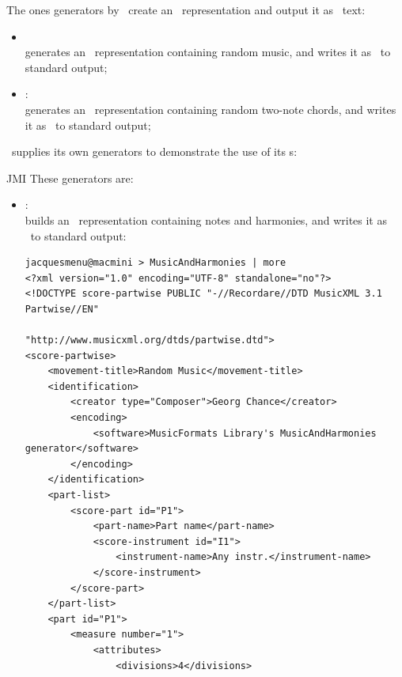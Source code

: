The ones generators by \libmusicxml\ create an \mxsrRepr\ representation and output it as \mxml\ text:
\begin{itemize}
\item {} \\
generates an \mxsrRepr\ representation containing random music, and writes it as \mxml\ to standard output;

\item {}:\\
generates an \mxsrRepr\ representation containing random two-note chords, and writes it as \mxml\ to standard output;
\end{itemize}

\mf\ supplies its own generators to demonstrate the use of its \API s:
%
\begin{itemize}JMI
%
These generators are:
\begin{itemize}
\item {}: \\
builds an \mxsrRepr\ representation containing notes and harmonies, and writes it as \mxml\ to standard output:
\begin{lstlisting}[language=MusicXML]
jacquesmenu@macmini > MusicAndHarmonies | more
<?xml version="1.0" encoding="UTF-8" standalone="no"?>
<!DOCTYPE score-partwise PUBLIC "-//Recordare//DTD MusicXML 3.1 Partwise//EN"
                        "http://www.musicxml.org/dtds/partwise.dtd">
<score-partwise>
    <movement-title>Random Music</movement-title>
    <identification>
        <creator type="Composer">Georg Chance</creator>
        <encoding>
            <software>MusicFormats Library's MusicAndHarmonies generator</software>
        </encoding>
    </identification>
    <part-list>
        <score-part id="P1">
            <part-name>Part name</part-name>
            <score-instrument id="I1">
                <instrument-name>Any instr.</instrument-name>
            </score-instrument>
        </score-part>
    </part-list>
    <part id="P1">
        <measure number="1">
            <attributes>
                <divisions>4</divisions>

\end{lstlisting}
\end{itemize}
\end{itemize}
